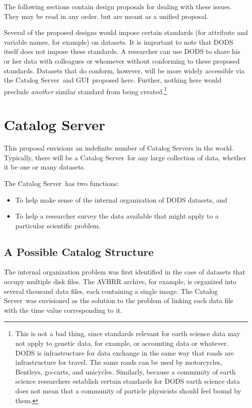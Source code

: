 \documentclass[10pt]{report}
\newcommand{\cs}{Catalog Server}
\newcommand{\gui}{GUI}
\begin{document}
The following sections contain design proposals for dealing with these
issues.  They may be read in any order, but are meant as a unified
proposal.

Several of the proposed designs would impose certain standards (for
attribute and variable names, for example) on datasets.  It is
important to note that DODS itself does not impose these standards.  A
researcher can use DODS to share his or her data with colleagues or
whomever without conforming to these proposed standards.  Datasets
that do conform, however, will be more widely accessible via the \cs\ 
and \gui\ proposed here.  Further, nothing here would preclude
\emph{another} similar standard from being created.\footnote{This is
  not a bad thing, since standards relevant for earth science data may
  not apply to genetic data, for example, or accounting data or
  whatever.  DODS is infrastructure for data exchange in the same way
  that roads are infrastructure for travel.  The same roads can be
  used by motorcycles, Bentleys, go-carts, and unicycles.  Similarly,
  because a community of earth science researchers establish certain
  standards for DODS earth science data does not mean that a community
  of particle physicists should feel bound by them.}


\chapter{Catalog Server}
\label{sec:catalog}

\cbstart
This proposal envisions an indefinite number of \cs s in the world.
Typically, there will be a \cs\ for any large collection of data,
whether it be one or many datasets.

The \cs\ has two functions:

\begin{itemize}
\item To help make sense of the internal organization of DODS
  datasets, and
\item To help a researcher survey the data available that might apply
  to a particular scientific problem.
\end{itemize}

\section{A Possible Catalog Structure}
\label{sec:dbstruct}

The internal organization problem was first identified in the case of
datasets that occupy multiple disk files.  The AVHRR archive, for
example, is organized into several thousand data files, each
containing a single image.  The \cs\ was envisioned as the solution to
the problem of linking each data file with the time value
corresponding to it.
\end{document}
